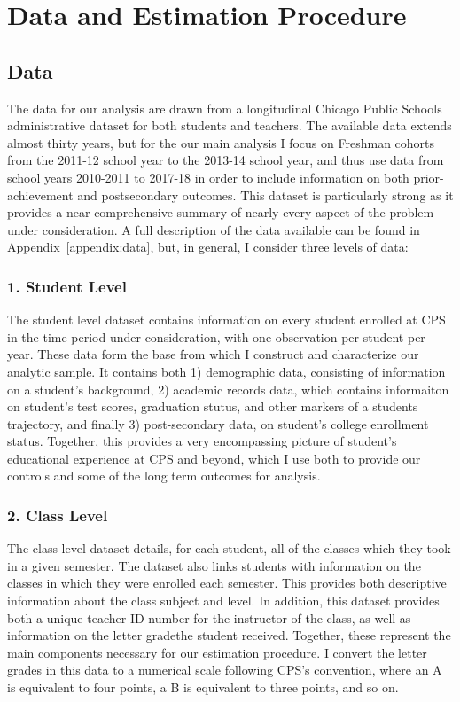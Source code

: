 \documentclass[../thesis_main.tex]{subfiles}
\begin{document}
\doublespacing
\section{Data and Estimation Procedure}
\label{section:data}

\subsection{Data}

The data for our analysis are drawn from a longitudinal Chicago Public Schools administrative dataset for both students and teachers. The available data extends almost thirty years, but for the our main analysis I  focus on Freshman cohorts from the 2011-12 school year to the 2013-14 school year, and thus use data from school years 2010-2011 to 2017-18 in order to include information on both prior-achievement and postsecondary outcomes. This dataset is particularly strong as it provides a near-comprehensive summary of nearly every aspect of the problem under consideration. A full description of the data available can be found in Appendix~\ref{appendix:data}, but, in general, I  consider three levels of data:

\subsubsection{1. Student Level} 

The student level dataset contains information on every student enrolled at CPS in the time period under consideration, with one observation per student per year. These data form the base from which I  construct and characterize our analytic sample. It contains both 1) demographic data, consisting of information on a student's background, 2) academic records data, which contains informaiton on student's test scores, graduation stutus, and other markers of a students trajectory, and finally 3) post-secondary data, on student's college enrollment status. Together, this provides a very encompassing picture of student's educational experience at CPS and beyond, which I  use both to provide our controls and some of the long term outcomes for analysis. 

\subsubsection{2. Class Level}

The class level dataset details, for each student, all of the classes which they took in a given semester. The dataset also links students with information on the classes in which they were enrolled each semester. This provides both descriptive information about the class subject and level. In addition, this dataset provides both a unique teacher ID number for the instructor of the class, as well as information on the letter gradethe student received. Together, these represent the main components necessary for our estimation procedure. I convert the letter grades in this data to a numerical scale following CPS's convention, where an A is equivalent to four points, a B is equivalent to three points, and so on. 
\end{document}
